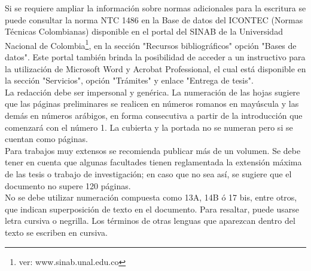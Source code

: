 Si se requiere ampliar la información sobre normas adicionales para la escritura se puede consultar la norma NTC 1486 en la Base de datos del ICONTEC (Normas Técnicas Colombianas) disponible en el portal del SINAB de la Universidad Nacional de Colombia\footnote{ver: www.sinab.unal.edu.co}, en la sección "Recursos bibliográficos" opción "Bases de datos".  Este portal también brinda la posibilidad de acceder a un instructivo para la utilización de Microsoft Word y Acrobat Professional, el cual está disponible en la sección "Servicios", opción "Trámites" y enlace "Entrega de tesis".\\

La redacción debe ser impersonal y genérica. La numeración de las hojas sugiere que las páginas preliminares se realicen en números romanos en mayúscula y las demás en números arábigos, en forma consecutiva a partir de la introducción que comenzará con el número 1. La cubierta y la portada no se numeran pero si se cuentan como páginas.\\

Para trabajos muy extensos se recomienda publicar más de un volumen. Se debe tener en cuenta que algunas facultades tienen reglamentada la extensión máxima de las tesis  o trabajo de investigación; en caso que no sea así, se sugiere que el documento no supere 120 páginas.\\

No se debe utilizar numeración compuesta como 13A, 14B ó 17 bis, entre otros, que indican superposición de texto en el documento. Para resaltar, puede usarse letra cursiva o negrilla. Los términos de otras lenguas que aparezcan dentro del texto se escriben en cursiva.\\

\fi